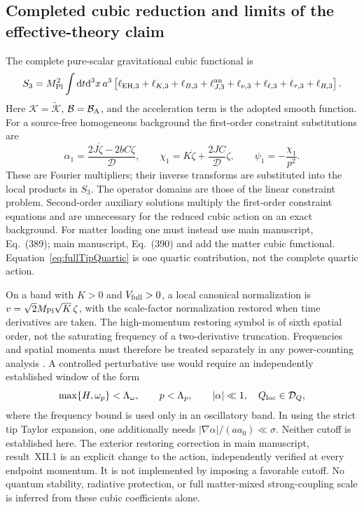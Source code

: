 \documentclass[aps,prd,reprint,onecolumn,notitlepage,nofootinbib,longbibliography,floatfix]{revtex4-2}
\theoremstyle{scstyle}
\theoremstyle{definition}
\theoremstyle{remark}
\newcommand{\dd}{\mathrm{d}}
\newcommand{\mpl}{M_{\rm Pl}}
\newcommand{\cK}{\mathcal K}
\newcommand{\cB}{\mathcal B}
\newcommand{\Kt}{\widetilde{\mathcal K}}
\begin{document}
\subsection{Completed cubic reduction and limits of the effective-theory claim}
The complete pure-scalar gravitational cubic functional is
\begin{equation}
S_3=\mpl^2\int\dd t\dd^3x\,a^3
\left[\ell_{{\rm EH},3}+\ell_{K,3}+\ell_{B,3}
+\ell_{J,3}^{\rm an}+\ell_{\nu,3}+\ell_{\ell,3}+\ell_{\tau,3}+\ell_{R,3}\right].
\label{eq:eftFullAnalytic3}
\end{equation}
Here $\cK=\Kt$, $\cB=\cB_{\rm A}$, and the acceleration term is the
adopted smooth function. For a source-free homogeneous background the
first-order constraint substitutions are
\begin{equation}
\alpha_1=\frac{2J\dot\zeta-2bC\zeta}{\mathcal D},\qquad
\chi_1=K\dot\zeta+\frac{2JC}{\mathcal D}\zeta,\qquad
\psi_1=-\frac{\chi_1}{p^2}.
\label{eq:eftCubicReduction}
\end{equation}
These are Fourier multipliers; their inverse transforms are substituted
into the local products in $S_3$. The operator domains are those of the
linear constraint problem. Second-order auxiliary solutions multiply the
first-order constraint equations and are unnecessary for the reduced
cubic action on an exact background. For matter loading one must instead
use main manuscript, Eq.~(389); main manuscript, Eq.~(390) and add the matter cubic
functional. Equation~\eqref{eq:fullTipQuartic} is one quartic contribution,
not the complete quartic action.

On a band with $K>0$ and $V_{\rm full}>0$, a local canonical normalization
is $v=\sqrt{2}\mpl\sqrt K\,\zeta$, with the scale-factor normalization
restored when time derivatives are taken. The high-momentum restoring
symbol is of sixth spatial order, not the saturating frequency of a
two-derivative truncation. Frequencies and spatial momenta must therefore
be treated separately in any power-counting analysis
\cite{Cheung2008,BlasPujolasSibiryakov2011}. A controlled perturbative use
would require an independently established window of the form
\begin{equation}
\max\{H,\omega_p\}<\Lambda_\omega,
\qquad p<\Lambda_p,\qquad
|\alpha|\ll1,
\quad Q_{\rm loc}\in\mathcal D_Q,
\label{eq:eftDerivativeDomain}
\end{equation}
where the frequency bound is used only in an oscillatory band. In using
the strict tip Taylor expansion, one additionally needs
$|\nabla\alpha|/(aa_0)\ll\sigma$. Neither cutoff is established here.
The exterior restoring correction in main manuscript, result~XII.1
is an explicit change to the action, independently verified at every
endpoint momentum. It is not implemented by imposing a favorable cutoff. No quantum stability, radiative protection,
or full matter-mixed strong-coupling scale is inferred from these cubic
coefficients alone.
\end{document}
